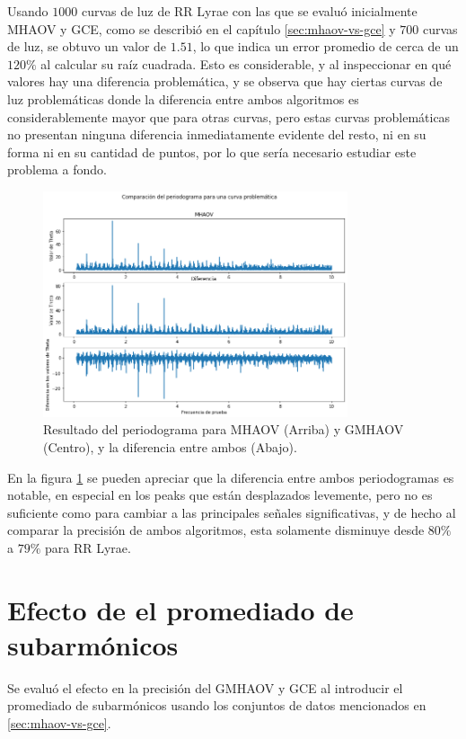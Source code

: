 Usando $1000$ curvas de luz de RR Lyrae con las que se evaluó inicialmente MHAOV y GCE, como se describió en el capítulo \ref{sec:mhaov-vs-gce} y $700$ curvas de luz, se obtuvo un valor de $1.51$, lo que indica un error promedio de cerca de un $120\%$ al calcular su raíz cuadrada. Esto es considerable, y al inspeccionar en qué valores hay una diferencia problemática, y se observa que hay ciertas curvas de luz problemáticas donde la diferencia entre ambos algoritmos es considerablemente mayor que para otras curvas, pero estas curvas problemáticas no presentan ninguna diferencia inmediatamente evidente del resto, ni en su forma ni en su cantidad de puntos, por lo que sería necesario estudiar este problema a fondo.

\begin{figure}[H]
    \centering
    \includegraphics[width=0.8\textwidth]{figs/problemas.png}
    \caption{Resultado del periodograma para MHAOV (Arriba) y GMHAOV (Centro), y la diferencia entre ambos (Abajo).}
    \label{fig:problemas}
\end{figure}
En la figura \ref{fig:problemas} se pueden apreciar que la diferencia entre ambos periodogramas es notable, en especial en los peaks que están desplazados levemente, pero no es suficiente como para cambiar a las principales señales significativas, y de hecho al comparar la precisión de ambos algoritmos, esta solamente disminuye desde $80\%$ a $79\%$ para RR Lyrae.

\section{Efecto de el promediado de subarmónicos}\label{sec:efectos-subarmonicos}

Se evaluó el efecto en la precisión del GMHAOV y GCE al introducir el promediado de subarmónicos usando los conjuntos de datos mencionados en \ref{sec:mhaov-vs-gce}. 

